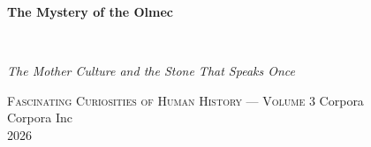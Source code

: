 \clearpage
\vspace*{1.5in}
\begin{center}
  \begin{minipage}{\textwidth}
    \centering
    \Huge\bfseries
    \linespread{1.25}\selectfont
    The Mystery of the Olmec
  \end{minipage}
  \\[3em]
  {\Large\itshape\linespread{1.3}\selectfont
  The Mother Culture and the Stone That Speaks Once\par}
  \vspace{2em}
  {\small\scshape Fascinating Curiosities of Human History — Volume 3}
  \vfill
  {\large Corpora}
  \\[1em]
  {\large Corpora Inc}
  \\[1em]
  {\large 2026}
\end{center}
\clearpage
